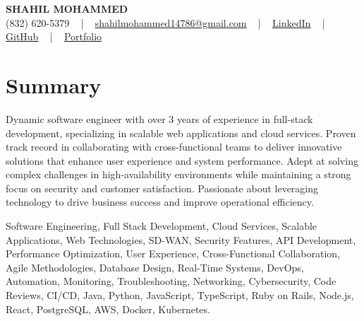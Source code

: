 \documentclass[letterpaper,10pt]{article}
\begin{document}
\begin{center}
    {\fontsize{14pt}{12pt}\selectfont \textbf{\MakeUppercase{Shahil Mohammed}}}\\ \vspace{2pt}
    \fontsize{10pt}{12pt}\selectfont (832) 620-5379 ~ | ~ \href{mailto:shahilmohammed14786@gmail.com}{shahilmohammed14786@gmail.com} ~ | ~  
    \href{https://www.linkedin.com/in/shahil-mohammed-9652931a1/}{\color{blue}\underline{LinkedIn}}  ~ | ~ 
    \href{https://github.com/freakbeast14}{\color{blue}\underline{GitHub}} ~ | ~ 
    \href{https://shahil-mohammed.netlify.app/}{\color{blue}\underline{Portfolio}}
    \vspace{-8pt}
\end{center}

\section{Summary}
\vspace{-2pt}\fontsize{8pt}{9pt}\selectfont
Dynamic software engineer with over 3 years of experience in full-stack development, specializing in scalable web applications and cloud services. Proven track record in collaborating with cross-functional teams to deliver innovative solutions that enhance user experience and system performance. Adept at solving complex challenges in high-availability environments while maintaining a strong focus on security and customer satisfaction. Passionate about leveraging technology to drive business success and improve operational efficiency.
 \vspace{-5pt}
 
{\fontsize{1pt}{1pt}\selectfont\color{white}
Software Engineering, Full Stack Development, Cloud Services, Scalable Applications, Web Technologies, SD-WAN, Security Features, API Development, Performance Optimization, User Experience, Cross-Functional Collaboration, Agile Methodologies, Database Design, Real-Time Systems, DevOps, Automation, Monitoring, Troubleshooting, Networking, Cybersecurity, Code Reviews, CI/CD, Java, Python, JavaScript, TypeScript, Ruby on Rails, Node.js, React, PostgreSQL, AWS, Docker, Kubernetes.
}
\vspace{-8pt}

\vspace{-2pt}
\end{document}
